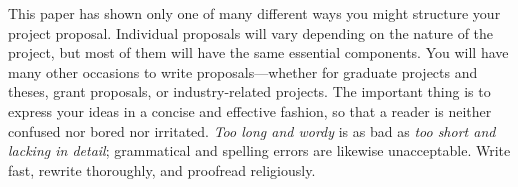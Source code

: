 \documentclass[11pt]{article}
\begin{document}
This paper has shown only one of many different ways you might structure
your project proposal.  Individual proposals will vary depending on the
nature of the project, but most of them will have the same essential
components.  You will have many other occasions to write
proposals---whether for graduate projects and theses, grant proposals,
or industry-related projects.  The important thing is to express
your ideas in a concise and effective fashion, so that a reader is
neither confused nor bored nor irritated.  \emph{Too long and wordy}
is as bad as \emph{too short and lacking in detail}; grammatical
and spelling errors are likewise unacceptable.  Write fast, rewrite
thoroughly, and proofread religiously.

\pagebreak

\nocite{*}

\begin{spacing}{1}
  
  
\end{spacing}
\end{document}
